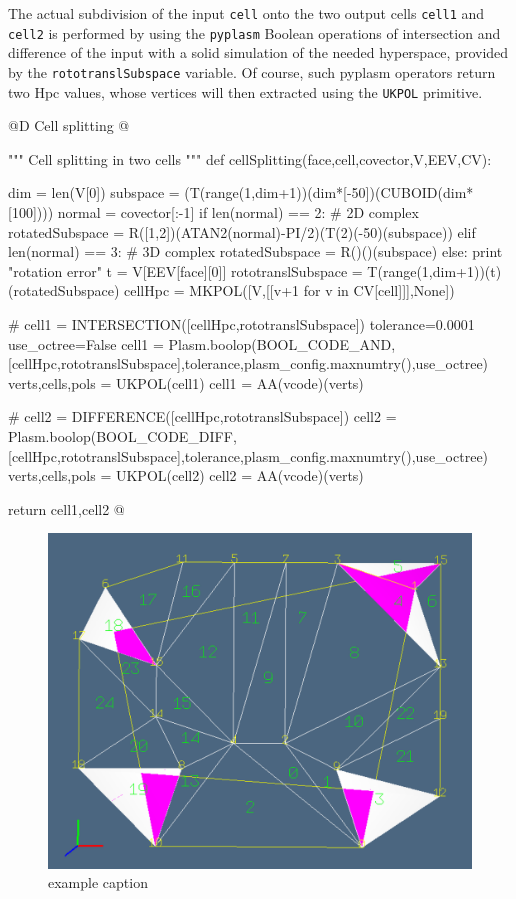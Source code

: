 \documentclass[11pt,oneside]{article}	%
\begin{document}
The actual subdivision of the input \texttt{cell} onto the two output cells \texttt{cell1} and \texttt{cell2} is performed by using the \texttt{pyplasm} Boolean operations of intersection and difference of the input with a solid simulation of the needed hyperspace, provided by the \texttt{rototranslSubspace} variable. Of course, such pyplasm operators return two Hpc values, whose vertices will then extracted using the \texttt{UKPOL} primitive.

@D Cell splitting
@{""" Cell splitting in two cells """
def cellSplitting(face,cell,covector,V,EEV,CV):

	dim = len(V[0])
	subspace = (T(range(1,dim+1))(dim*[-50])(CUBOID(dim*[100])))
	normal = covector[:-1]
	if len(normal) == 2:  # 2D complex
		rotatedSubspace = R([1,2])(ATAN2(normal)-PI/2)(T(2)(-50)(subspace))
	elif len(normal) == 3:  # 3D complex
		rotatedSubspace = R()()(subspace)
	else: print "rotation error"
	t = V[EEV[face][0]]
	rototranslSubspace = T(range(1,dim+1))(t)(rotatedSubspace)
	cellHpc = MKPOL([V,[[v+1 for v in CV[cell]]],None])
	
	# cell1 = INTERSECTION([cellHpc,rototranslSubspace])
	tolerance=0.0001
	use_octree=False
	cell1 = Plasm.boolop(BOOL_CODE_AND, 
		[cellHpc,rototranslSubspace],tolerance,plasm_config.maxnumtry(),use_octree)
	verts,cells,pols = UKPOL(cell1)
	cell1 = AA(vcode)(verts)

	# cell2 = DIFFERENCE([cellHpc,rototranslSubspace])	
	cell2 = Plasm.boolop(BOOL_CODE_DIFF, 
		[cellHpc,rototranslSubspace],tolerance,plasm_config.maxnumtry(),use_octree)
	verts,cells,pols = UKPOL(cell2)
	cell2 = AA(vcode)(verts)

	return cell1,cell2
@}

\begin{figure}[htbp] %
   \centering
   \includegraphics[width=0.6\linewidth]{images/seeds} 
   \caption{example caption}
   \label{fig:example}
\end{figure}
\end{document}
